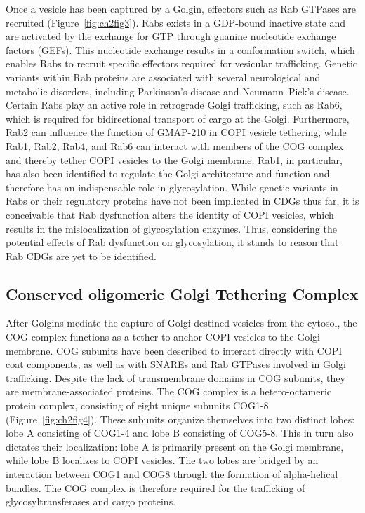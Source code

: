 Once a vesicle has been captured by a Golgin, effectors such as Rab GTPases are recruited (Figure~\ref{fig:ch2fig3}). Rabs exists in a GDP-bound inactive state and are activated by the exchange for GTP through guanine nucleotide exchange factors (GEFs). This nucleotide exchange results in a conformation switch, which enables Rabs to recruit specific effectors required for vesicular trafficking. Genetic variants within Rab proteins are associated with several neurological and metabolic disorders, including Parkinson’s disease and Neumann–Pick’s disease\cite{climer_defects_2015}. Certain Rabs play an active role in retrograde Golgi trafficking, such as Rab6, which is required for bidirectional transport of cargo at the Golgi\cite{miserey-lenkei_rab_2010}. Furthermore, Rab2 can influence the function of GMAP-210 in COPI vesicle tethering\cite{sato_coupling_2014}, while Rab1, Rab2, Rab4, and Rab6 can interact with members of the COG complex and thereby tether COPI vesicles to the Golgi membrane\cite{fukuda_regulation_2008}. Rab1, in particular, has also been identified to regulate the Golgi architecture and function and therefore has an indispensable role in glycosylation\cite{climer_defects_2015}. While genetic variants in Rabs or their regulatory proteins have not been implicated in CDGs thus far, it is conceivable that Rab dysfunction alters the identity of COPI vesicles, which results in the mislocalization of glycosylation enzymes. Thus, considering the potential effects of Rab dysfunction on glycosylation, it stands to reason that Rab CDGs are yet to be identified.

\subsection{Conserved oligomeric Golgi Tethering Complex}

After Golgins mediate the capture of Golgi-destined vesicles from the cytosol, the COG complex functions as a tether to anchor COPI vesicles to the Golgi membrane\cite{oka_genetic_2005,oka_cog_2004,WITKOS201716}. COG subunits have been described to interact directly with COPI coat components, as well as with SNAREs and Rab GTPases involved in Golgi trafficking\cite{lees_molecular_2010,blackburn_maintaining_2019,kudlyk_cog6_2013,shestakova_interaction_2007,willett_cog_2013,smith_cog_2009,willett_cog_2016}. Despite the lack of transmembrane domains in COG subunits, they are membrane-associated proteins. The COG complex is a hetero-octameric protein complex, consisting of eight unique subunits COG1-8 (Figure~\ref{fig:ch2fig4}). These subunits organize themselves into two distinct lobes: lobe A consisting of COG1-4 and lobe B consisting of COG5-8. This in turn also dictates their localization: lobe A is primarily present on the Golgi membrane, while lobe B localizes to COPI vesicles\cite{willett_cog_2016}. The two lobes are bridged by an interaction between COG1 and COG8 through the formation of alpha-helical bundles\cite{lees_molecular_2010,blackburn_maintaining_2019}. The COG complex is therefore required for the trafficking of glycosyltransferases and cargo proteins.

